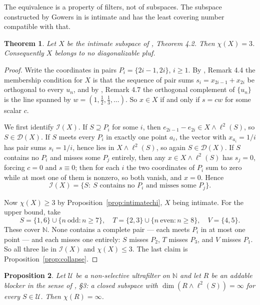\documentclass[11pt,reqno]{amsart}
\newtheorem{theorem}{Theorem}[section]
\newtheorem{proposition}[theorem]{Proposition}
\theoremstyle{definition}
\newcommand{\N}{\mathbb{N}}
\newcommand{\cD}{\mathcal{D}}
\newcommand{\cI}{\mathcal{I}}
\newcommand{\cU}{\mathcal{U}}
\begin{document}
The equivalence is a property of filters, not of subspaces. The subspace
constructed by Gowers in \cite{FWII} is intimate and has the least covering
number compatible with that.

\begin{theorem}\label{thm:gowerschi}
Let $X$ be the intimate subspace of \cite{FWII}, Theorem 4.2. Then
$\chi(X)=3$. Consequently $X$ belongs to no diagonalizable pluf.
\end{theorem}

\begin{proof}
Write the coordinates in pairs $P_i=\{2i-1,2i\}$, $i\ge1$. By \cite{FWII},
Remark 4.4 the membership condition for $X$ is that the sequence of pair sums
$s_i=x_{2i-1}+x_{2i}$ be orthogonal to every $u_n$, and by \cite{FWII},
Remark 4.7 the orthogonal complement of $\{u_n\}$ is the line spanned by
$w=(1,\tfrac12,\tfrac13,\dots)$. So $x\in X$ if and only if $s=cw$ for some
scalar $c$.

We first identify $\cI(X)$. If $S\supseteq P_i$ for some $i$, then
$e_{2i-1}-e_{2i}\in X\wedge\ell^2(S)$, so $S\in\cD(X)$. If $S$ meets every
$P_i$ in exactly one point $a_i$, the vector with $x_{a_i}=1/i$ has pair sums
$s_i=1/i$, hence lies in $X\wedge\ell^2(S)$, so again $S\in\cD(X)$. If $S$
contains no $P_i$ and misses some $P_j$ entirely, then any
$x\in X\wedge\ell^2(S)$ has $s_j=0$, forcing $c=0$ and $s\equiv0$; then for
each $i$ the two coordinates of $P_i$ sum to zero while at most one of them is
nonzero, so both vanish, and $x=0$. Hence
\[
\cI(X)=\{S:\ S\text{ contains no }P_i\text{ and misses some }P_j\}.
\]

Now $\chi(X)\ge3$ by Proposition~\ref{prop:intimatechi}, $X$ being intimate.
For the upper bound, take
\[
S=\{1,6\}\cup\{n\ \text{odd}:n\ge7\},\quad
T=\{2,3\}\cup\{n\ \text{even}:n\ge8\},\quad
V=\{4,5\}.
\]
These cover $\N$. None contains a complete pair --- each meets $P_i$ in at most
one point --- and each misses one entirely: $S$ misses $P_2$, $T$ misses $P_3$,
and $V$ misses $P_1$. So all three lie in $\cI(X)$ and $\chi(X)\le3$. The last
claim is Proposition~\ref{prop:collapse}.
\end{proof}

\begin{proposition}\label{prop:blocker}
Let $\cU$ be a non-selective ultrafilter on $\N$ and let $R$ be an addable
blocker in the sense of \cite{FWII}, \S3: a closed subspace with
$\dim(R\wedge\ell^2(S))=\infty$ for every $S\in\cU$. Then $\chi(R)=\infty$.
\end{proposition}
\end{document}
